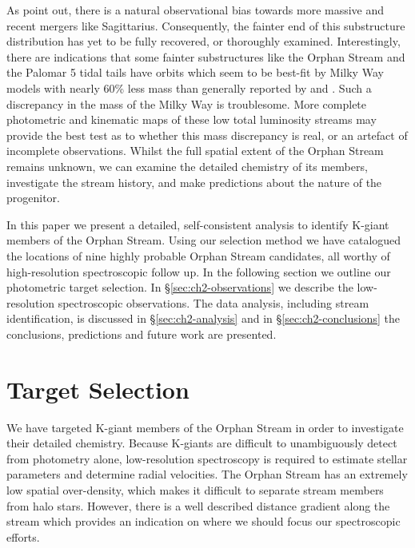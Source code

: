 As \citet{Sales_et-al_2008} point out, there is a natural observational bias towards more massive and recent mergers like Sagittarius. Consequently, the fainter end of this substructure distribution has yet to be fully recovered, or thoroughly examined. Interestingly, there are indications that  some fainter substructures like the Orphan Stream and the Palomar 5 tidal tails \citep{Odenkirchen_et-al_2009} have orbits which seem to be best-fit by Milky Way models with nearly 60\% less mass \citep{Newberg_et-al_2010} than generally reported by \citet{Xue_et-al_2008} and \citet{Koposov_et-al_2010}. Such a discrepancy in the mass of the Milky Way is troublesome. More complete photometric and kinematic maps of these low total luminosity streams may provide the best test as to whether this mass discrepancy is real, or an artefact of incomplete observations. Whilst the full spatial extent of the Orphan Stream remains unknown, we can examine the detailed chemistry of its members, investigate the stream history, and make predictions about the nature of the progenitor.

In this paper we present a detailed, self-consistent analysis to identify K-giant members of the Orphan Stream. Using our selection method we have catalogued the locations of nine highly probable Orphan Stream candidates, all worthy of high-resolution spectroscopic follow up. In the following section we outline our photometric target selection. In \S\ref{sec:ch2-observations} we describe the low-resolution spectroscopic observations. The data analysis, including stream identification, is discussed in \S\ref{sec:ch2-analysis} and in \S\ref{sec:ch2-conclusions} the conclusions, predictions and future work are presented.


\section{Target Selection}
\label{sec:ch2-target-selection}

We have targeted K-giant members of the Orphan Stream in order to investigate their detailed chemistry. Because K-giants are difficult to unambiguously detect from photometry alone, low-resolution spectroscopy is required to estimate stellar parameters and determine radial velocities. The Orphan Stream has an extremely low spatial over-density, which makes it difficult to separate stream members from halo stars. However, there is a well described distance gradient along the stream \citep{Belokurov_et-al_2007, Newberg_et-al_2010} which provides an indication on where we should focus our spectroscopic efforts.

